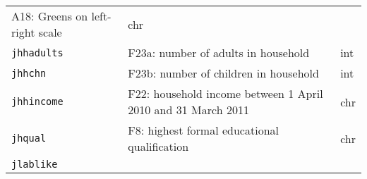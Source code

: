 \documentclass[]{article}
\begin{document}
\begin{longtable}[]{@{}lll@{}}
\begin{minipage}[t]{0.70\columnwidth}
A18: Greens on left-right scale\strut
\end{minipage} & \begin{minipage}[t]{0.08\columnwidth}\raggedright\strut
chr\strut
\end{minipage}\tabularnewline
\begin{minipage}[t]{0.14\columnwidth}\raggedright\strut
\texttt{jhhadults}\strut
\end{minipage} & \begin{minipage}[t]{0.70\columnwidth}\raggedright\strut
F23a: number of adults in household\strut
\end{minipage} & \begin{minipage}[t]{0.08\columnwidth}\raggedright\strut
int\strut
\end{minipage}\tabularnewline
\begin{minipage}[t]{0.14\columnwidth}\raggedright\strut
\texttt{jhhchn}\strut
\end{minipage} & \begin{minipage}[t]{0.70\columnwidth}\raggedright\strut
F23b: number of children in household\strut
\end{minipage} & \begin{minipage}[t]{0.08\columnwidth}\raggedright\strut
int\strut
\end{minipage}\tabularnewline
\begin{minipage}[t]{0.14\columnwidth}\raggedright\strut
\texttt{jhhincome}\strut
\end{minipage} & \begin{minipage}[t]{0.70\columnwidth}\raggedright\strut
F22: household income between 1 April 2010 and 31 March 2011\strut
\end{minipage} & \begin{minipage}[t]{0.08\columnwidth}\raggedright\strut
chr\strut
\end{minipage}\tabularnewline
\begin{minipage}[t]{0.14\columnwidth}\raggedright\strut
\texttt{jhqual}\strut
\end{minipage} & \begin{minipage}[t]{0.70\columnwidth}\raggedright\strut
F8: highest formal educational qualification\strut
\end{minipage} & \begin{minipage}[t]{0.08\columnwidth}\raggedright\strut
chr\strut
\end{minipage}\tabularnewline
\begin{minipage}[t]{0.14\columnwidth}\raggedright\strut
\texttt{jlablike}\strut

\end{minipage}
\end{longtable}
\end{document}
